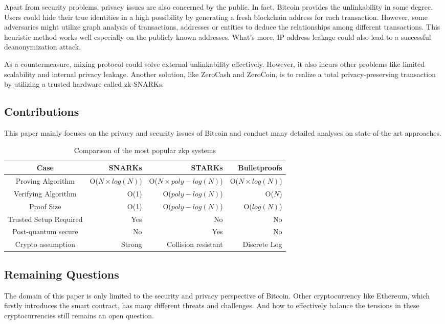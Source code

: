 \documentclass[conference]{IEEEtran}
\begin{document}
Apart from security problems, privacy issues are also concerned by the public.
%
In fact, Bitcoin provides the unlinkability in some degree.
%
Users could hide their true identities in a high possibility by generating a fresh blockchain address for each transaction.
%
However, some adversaries might utilize graph analysis of transactions, addresses or entities to deduce the relationships among different transactions.
%
This heuristic method works well especially on the publicly known addresses.
%
What's more, IP address leakage could also lead to a successful deanonymization attack.

As a countermeasure, mixing protocol could solve external unlinkability effectively.
%
However, it also incurs other problems like limited scalability and internal privacy leakage.
%
Another solution, like ZeroCash and ZeroCoin, is to realize a total privacy-preserving transaction by utilizing a trusted hardware called zk-SNARKs. 

\subsection{Contributions}
This paper mainly focuses on the privacy and security issues of Bitcoin and conduct many detailed analyses on state-of-the-art approaches.

\begin{table*}[!t]
    \caption{Comparison of the most popular zkp systems}
    \centering
    \begin{tabular}{c rrr}
        \hline \hline
        Case & SNARKs & STARKs & Bulletproofs \\
        \hline
        Proving Algorithm & O($N {\times} log(N)$) & O($N {\times} poly{-}log(N)$) & O($N {\times} log(N)$) \\
        Verifying Algorithm & O(1) & O($poly{-}log(N)$) & O($N$) \\
        Proof Size & O(1) & O($poly{-}log(N)$) & O($log(N)$) \\
        Trusted Setup Required & Yes & No & No \\
        Post-quantum secure & No & Yes & No \\
        Crypto assumption & Strong & Collision resistant & Discrete Log \\
        \hline
    \end{tabular}
    \label{compare}
\end{table*}

\subsection{Remaining Questions}
The domain of this paper is only limited to the security and privacy perspective of Bitcoin.
%
Other cryptocurrency like Ethereum, which firstly introduces the smart contract, has many different threats and challenges.
%
And how to effectively balance the tensions in these cryptocurrencies still remains an open question.
\end{document}
